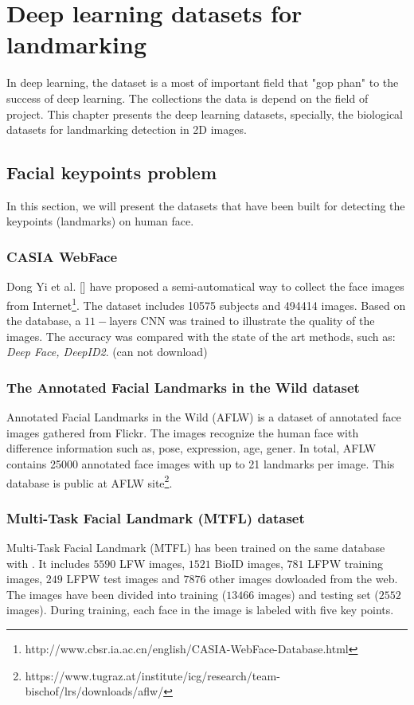 \chapter{Deep learning datasets for landmarking}
In deep learning, the dataset is a most of important field that "gop phan" to the success of deep learning. The collections the data is depend on the field of project. This chapter presents the deep learning datasets, specially, the biological datasets for landmarking detection in 2D images. 
\section{Facial keypoints problem}
In this section, we will present the datasets that have been built for detecting the keypoints (landmarks) on human face.
\subsection{CASIA WebFace}
Dong Yi et al. [] have proposed a semi-automatical way to collect the face images from Internet\footnote{http://www.cbsr.ia.ac.cn/english/CASIA-WebFace-Database.html}. The dataset includes 10575 subjects and 494414 images. Based on the database, a $11-$layers CNN was trained to illustrate the quality of the images. The accuracy was compared with the state of the art methods, such as: \textit{Deep Face, DeepID2}. (can not download)

\subsection{The Annotated Facial Landmarks in the Wild dataset}
Annotated Facial Landmarks in the Wild (AFLW) \cite{koestinger11a} is a dataset of annotated face images gathered from Flickr. The images recognize the human face with difference  information such as, pose, expression, age, gener. In total, AFLW contains 25000 annotated face images with up to 21 landmarks per image. This database is public at AFLW site\footnote{https://www.tugraz.at/institute/icg/research/team-bischof/lrs/downloads/aflw/}.
\subsection{Multi-Task Facial Landmark (MTFL) dataset}
Multi-Task Facial Landmark (MTFL) has been trained on the same database with \cite{sun2013deep}. It includes $5590$ LFW images, $1521$ BioID images, $781$ LFPW training images, $249$ LFPW test images and $7876$ other images dowloaded from the web. The images have been divided into training ($13466$ images) and testing set ($2552$ images). During training, each face in the image is labeled with five key points. 
